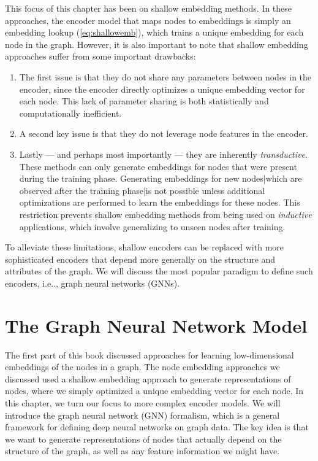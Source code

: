 \documentclass[10pt]{book}
\begin{document}
This focus of this chapter has been on shallow embedding methods. In these approaches, the encoder model that maps nodes to embeddings is simply an embedding lookup (\autoref{eq:shallowemb}), which trains a unique embedding for each node in the graph. However, it is also important to note that shallow embedding approaches suffer from some important drawbacks:
\begin{enumerate}
    \item The first issue is that they do not share any parameters between nodes in the encoder, since the encoder directly optimizes a unique embedding vector for each node. This lack of parameter sharing is both statistically and computationally inefficient.
    \item A second key issue is that they do not leverage node features in the encoder.
    \item Lastly --- and perhaps most importantly --- they are inherently \emph{transductive}. These methods can only generate embeddings for nodes that were present during the training phase. Generating embeddings for new nodes|which are observed after the training phase|is not possible unless additional optimizations are performed to learn the embeddings for these nodes. This restriction prevents shallow embedding methods from being used on \emph{inductive} applications, which involve generalizing to unseen nodes after training.
\end{enumerate}

To alleviate these limitations, shallow encoders can be replaced with more sophisticated encoders that depend more generally on the structure and attributes of the graph. We will discuss the most popular paradigm to define such encoders, i.e.., graph neural networks (GNNs).


\section{The Graph Neural Network Model}
\label{sec:GNNmodel}

The first part of this book discussed approaches for learning low-dimensional embeddings of the nodes in a graph. The node embedding approaches we discussed used a shallow embedding approach to generate representations of nodes, where we simply optimized a unique embedding vector for each node. In this chapter, we turn our focus to more complex encoder models. We will introduce the graph neural network (GNN) formalism, which is a general framework for defining deep neural networks on graph data. The key idea is that we want to generate representations of nodes that actually depend on the structure of the graph, as well as any feature information we might have.
\end{document}
